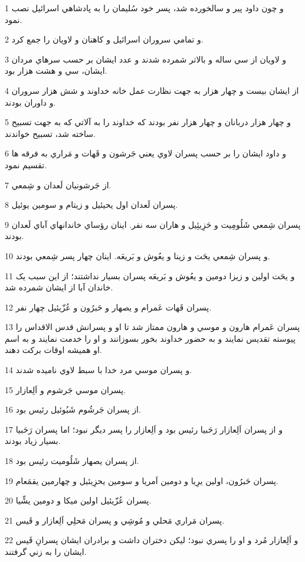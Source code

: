 \par 1 و چون داود پير و سالخورده شد، پسر خود سُليمان را به پادشاهي اسرائيل نصب نمود.
\par 2 و تمامي سروران اسرائيل و کاهنان و لاويان را جمع کرد.
\par 3 و لاويان از سي ساله و بالاتر شمرده شدند و عدد ايشان بر حسب سرهاي مردان ايشان، سي و هشت هزار بود.
\par 4 از ايشان بيست و چهار هزار به جهت نظارت عمل خانه خداوند و شش هزار سروران و داوران بودند.
\par 5 و چهار هزار دربانان و چهار هزار نفر بودند که خداوند را به آلاتي که به جهت تسبيح ساخته شد، تسبيح خواندند.
\par 6 و داود ايشان را بر حسب پسران لاوي يعني جَرشون و قَهات و مَراري به فرقه ها تقسيم نمود.
\par 7 از جَرشونيان لَعدان و شِمعي.
\par 8 پسران لَعدان اول يحيئيل و زيتام و سومين يوئيل.
\par 9 پسران شِمعي شَلُومِيت و حَزِيئِيل و هاران سه نفر. اينان رؤساي خاندانهاي آباي لَعدان بودند.
\par 10 و پسران شِمعي يحَت و زينا و يعُوش و بَريعَه. اينان چهار پسر شِمعي بودند.
\par 11 و يحَت اولين و زيزا دومين و يعُوش و بَريعَه پسران بسيار نداشتند؛ از اين سبب يک خاندان آبا از ايشان شمرده شد.
\par 12 پسران قَهات عَمرام و يصهار و حَبرُون و عُزّيئيل چهار نفر.
\par 13 پسران عَمرام هارون و موسي و هارون ممتاز شد تا او و پسرانش قدس الاقداس را پيوسته تقديس نمايند و به حضور خداوند بخور بسوزانند و او را خدمت نمايند و به اسم او هميشه اوقات برکت دهند.
\par 14 و پسران موسي مرد خدا با سبط لاوي ناميده شدند.
\par 15 پسران موسي جَرشوم و اَلِعازار.
\par 16 از پسران جَرشُوم شَبُوئيل رئيس بود.
\par 17 و از پسران اَلِعازار رَحَبيا رئيس بود و اَلِعازار را پسر ديگر نبود؛ اما پسران رَحَبيا بسيار زياد بودند.
\par 18 از پسران يصهار شَلُوميت رئيس بود.
\par 19 پسران حَبرُون، اولين يرِيا و دومين اَمريا و سومين يحزِيئيل و چهارمين يقمَعام.
\par 20 پسران عُزّيئيل اولين ميکا و دومين يشِّيا.
\par 21 پسران مَراري مَحلي و مُوشِي و پسران مَحلِي اَلِعازار و قَيس.
\par 22 و اَلِعازار مُرد و او را پسري نبود؛ ليکن دختران داشت و برادران ايشان پسرانِ قَيس ايشان را به زني گرفتند.
